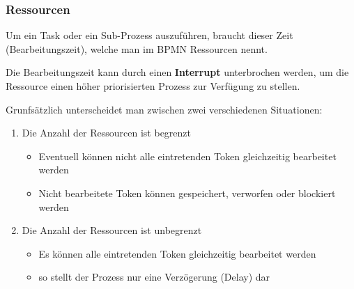 \subsubsection{Ressourcen}
Um ein Task oder ein Sub-Prozess auszuführen, braucht dieser Zeit (Bearbeitungszeit), welche man im BPMN Ressourcen nennt.

Die Bearbeitungszeit kann durch einen \textbf{Interrupt} unterbrochen werden, um die Ressource einen höher priorisierten Prozess zur Verfügung zu stellen.

Grunfsätzlich unterscheidet man zwischen zwei verschiedenen Situationen:
\begin{enumerate}
    \item Die Anzahl der Ressourcen ist begrenzt
    \begin{itemize}
        \item Eventuell können nicht alle eintretenden Token gleichzeitig bearbeitet werden
        \item Nicht bearbeitete Token können gespeichert, verworfen oder blockiert werden
    \end{itemize}
    \item Die Anzahl der Ressourcen ist unbegrenzt
    \begin{itemize}
        \item Es können alle eintretenden Token gleichzeitig bearbeitet werden
        \item so stellt der Prozess nur eine Verzögerung (Delay) dar
    \end{itemize}
\end{enumerate}

